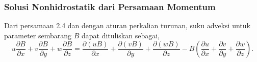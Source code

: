 \begin{spacing}{1.5}
\subsubsection[Solusi Nonhidrostatik dari Persamaan Momentum]{Solusi Nonhidrostatik dari Persamaan Momentum}
	Dari persamaan 2.4 dan dengan aturan perkalian turunan, suku adveksi untuk parameter sembarang $B$ dapat dituliskan sebagai,
	\begin{equation*}
		u\frac{\partial B}{\partial x} + v\frac{\partial B}{\partial y} + w\frac{\partial B}{\partial z} = \frac{\partial (uB)}{\partial x} + \frac{\partial (vB)}{\partial y} + \frac{\partial (wB)}{\partial z} - B\left(\frac{\partial u}{\partial x} + \frac{\partial v}{\partial y} + \frac{\partial w}{\partial z}\right).
	\end{equation*}
	

\end{spacing}
